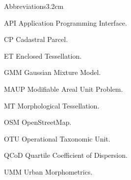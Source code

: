 \begin{mclistof}{Abbreviations}{3.2cm}

\item[API] Application Programming Interface.

\item[CP] Cadastral Parcel.

\item[ET] Enclosed Tessellation.

\item[GMM] Gaussian Mixture Model.

\item[MAUP] Modifiable Areal Unit Problem.

\item[MT] Morphological Tessellation.

\item[OSM] OpenStreetMap.

\item[OTU] Operational Taxonomic Unit.

\item[QCoD] Quartile Coefficient of Dispersion.

\item[UMM] Urban Morphometrics.

\end{mclistof} 
